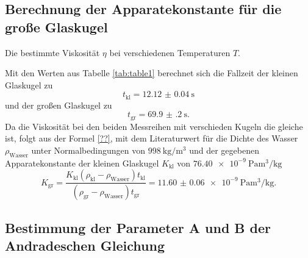 \subsection{Berechnung der Apparatekonstante für die große Glaskugel}
\begin{table}
	\centering
	\caption{Die bestimmte Viskosität $\eta$ bei verschiedenen Temperaturen $T$.}
	
\end{table}
Mit den Werten aus Tabelle \ref{tab:table1} berechnet sich die Fallzeit der kleinen Glaskugel zu
\begin{displaymath}
	t_\text{kl} = \SI{12.12(4)}{\second}
\end{displaymath}
und der großen Glaskugel zu
\begin{displaymath}
	t_\text{gr} = \SI{69.9(2)}{\second}\text{.}
\end{displaymath}
Da die Viskosität bei den beiden Messreihen mit verschieden Kugeln die gleiche ist, folgt aus der Formel \eqref{??}, mit dem Literaturwert für die Dichte des Wasser $\rho_\text{Wasser}$ unter Normalbedingungen von $\SI{998}{\kilo\gram\per\meter\tothe{3}}$ \cite{eta} und der gegebenen Apparatekonstante der kleinen Glaskugel $K_\text{kl}$ von $\SI{76.40e-9}{\pascal\meter\tothe{3}\per\kilo\gram}$
\begin{displaymath}
	K_\text{gr} = \frac{K_\text{kl} \left( \rho_\text{kl} - \rho_\text{Wasser}\right) t_\text{kl}}{\left( \rho_\text{gr} - \rho_\text{Wasser}\right) t_\text{gr}} = \SI{11.60(6)e-9}{\pascal\meter\tothe{3}\per\kilo\gram}\text{.}
\end{displaymath}

\subsection{Bestimmung der Parameter A und B der Andradeschen Gleichung}


